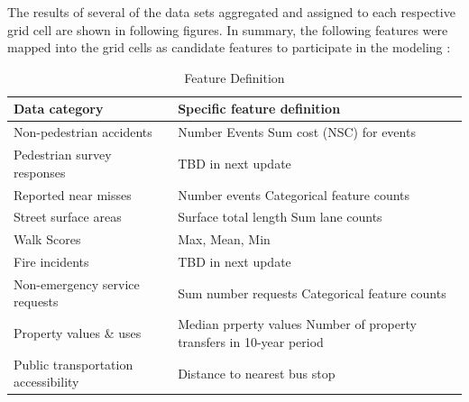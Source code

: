 \documentclass{llncs}
\begin{document}
The results of several of the data sets aggregated and assigned to each respective grid cell are shown in following figures. In summary, the following features were mapped into the grid cells as candidate features to participate in the modeling :

\FloatBarrier
\begin{table}
\begin{center}
\caption{Feature Definition}
\label{table : featureDefinition}
\begin{tabular}{p{50mm} p{60mm}}
\hline
\rule{0pt}{12pt}
Data category & Specific feature definition	\\[2pt]
\hline
Non-pedestrian accidents 		& Number Events \newline
															Sum cost (NSC) for events \\
Pedestrian survey responses & TBD in next update \\
Reported near misses 				& Number events \newline
                                                            Categorical feature counts \\
Street surface areas 				& Surface total length \newline
                                                            Sum lane counts  \\
Walk Scores 								& Max, Mean, Min  \\
Fire incidents 								& TBD in next update  \\
Non-emergency service requests & Sum number requests \newline
                                                                      Categorical feature counts\\ 
Property values \& uses 			& Median prperty values \newline
                                                            Number of property transfers in 10-year period  \\
Public transportation accessibility & Distance to nearest bus stop \\[2pt]
\hline
\end{tabular}
\end{center}
\end{table}
\FloatBarrier
%
\end{document}

